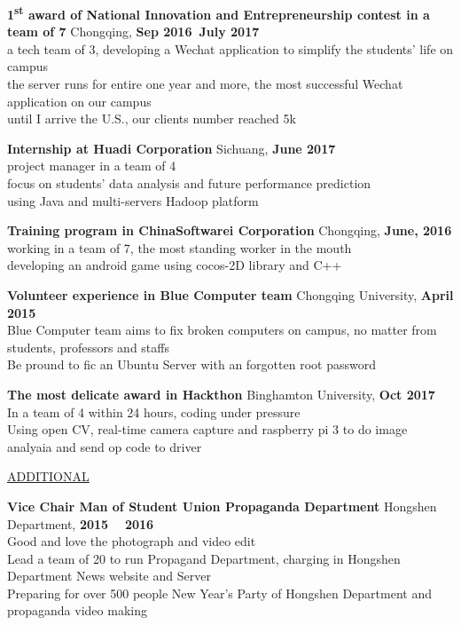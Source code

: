 \documentclass{article}
\begin{document}
\noindent
\textbf{1\textsuperscript{st} award of National Innovation and Entrepreneurship contest in a team of 7}
\hfill Chongqing, \textbf{Sep 2016~July 2017} \\
    \indent a tech team of 3, developing a Wechat application to simplify the students' life on campus \\
    \indent the server runs for entire one year and more, the most successful Wechat application on our campus \\
    \indent until I arrive the U.S., our clients number reached 5k
\begin{comment}
\end{comment}

\noindent
\textbf{Internship at Huadi Corporation}
\hfill Sichuang, \textbf{June 2017} \\
    \indent project manager in a team of 4 \\
    \indent focus on students' data analysis and future performance prediction \\
    \indent using Java and multi-servers Hadoop platform

\noindent
\textbf{Training program in ChinaSoftwarei Corporation}
\hfill Chongqing, \textbf{June, 2016} \\
    \indent working in a team of 7, the most standing worker in the mouth \\
    \indent developing an android game using cocos-2D library and C++

\noindent
\textbf{Volunteer experience in Blue Computer team}
\hfill Chongqing University, \textbf{April 2015} \\
    \indent Blue Computer team aims to fix broken computers on campus, no matter from students, professors and staffs \\
    \indent Be pround to fic an Ubuntu Server with an forgotten root password

\noindent
\textbf{The most delicate award in Hackthon}
\hfill Binghamton University, \textbf{Oct 2017} \\
    \indent In a team of 4 within 24 hours, coding under pressure \\
    \indent Using open CV, real-time camera capture and raspberry pi 3 to do image analyaia and send op code to driver

\begin{comment}
\noindent
\textbf{Research Assistant in G-lib}

\noindent
\textbf{Research Assistant in P-lib}
\end{comment}

\noindent
\uline{ADDITIONAL}

\noindent
\textbf{Vice Chair Man of Student Union Propaganda Department}
\hfill Hongshen Department, \textbf{2015 ~ 2016} \\
    \indent Good and love the photograph and video edit \\
    \indent Lead a team of 20 to run Propagand Department, charging in Hongshen Department News website and Server \\
    \indent Preparing for over 500 people New Year's Party of Hongshen Department and propaganda video making
\end{document}
